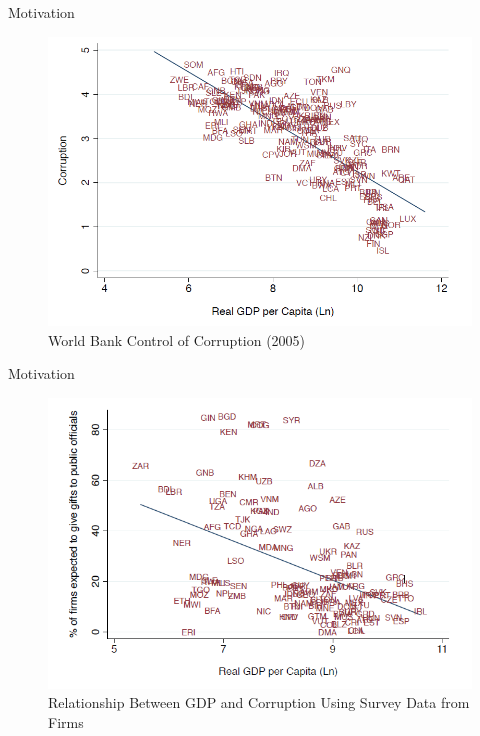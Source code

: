 \documentclass{beamer}
\begin{document}
\begin{frame}{Motivation}

\begin{figure}
\centering
\includegraphics[width=0.8\linewidth]{2.png}
\caption{World Bank Control of Corruption (2005)}
\end{figure}

\end{frame}

\begin{frame}{Motivation}

\begin{figure}
\centering
\includegraphics[width=0.8\linewidth]{3.png}
\caption{Relationship Between GDP and Corruption Using Survey Data from Firms}
\end{figure}

\end{frame}
\end{document}
